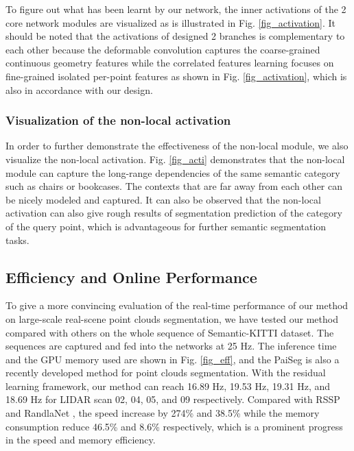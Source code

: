 \documentclass[journal]{IEEEtran}
\begin{document}
 To figure out what has been learnt by our network, the inner activations of the 2 core network modules are visualized as is illustrated in Fig. \ref{fig_activation}. It should be noted that the activations of designed 2 branches is complementary to each other because the deformable convolution captures the coarse-grained continuous geometry features while the correlated features learning focuses on fine-grained isolated per-point features as shown in Fig. \ref{fig_activation}, which is also in accordance with our design.
\subsubsection{Visualization of the non-local activation}


In order to further demonstrate the effectiveness of the non-local module, we also visualize the non-local activation. Fig. \ref{fig_acti} demonstrates that the non-local module can capture the long-range dependencies of the same semantic category such as chairs or bookcases. The contexts that are far away from each other can be nicely modeled and captured. It can also be observed that the non-local activation can also give rough results of segmentation prediction of the category of the query point, which is advantageous for further semantic segmentation tasks.
\vspace{-7mm}
\subsection{Efficiency and Online Performance}

To give a more convincing evaluation of the real-time performance of our method on large-scale real-scene point clouds segmentation, we have tested our method compared with others on the whole sequence of Semantic-KITTI \cite{behley2019semantickitti} dataset. The sequences are captured and fed into the networks at 25 Hz. The inference time and the GPU memory used are shown in Fig. \ref{fig_eff}, and the PaiSeg \cite{gao2020pai} is also a recently developed method for point clouds segmentation. With the residual learning framework, our method can reach 16.89 Hz, 19.53 Hz, 19.31 Hz, and 18.69 Hz for LIDAR scan 02, 04, 05, and 09 respectively. Compared with RSSP\cite{wang2019re} and RandlaNet \cite{hu2020randla}, the speed increase by 274\% and 38.5\% while the memory consumption reduce 46.5\% and 8.6\% respectively, which is a prominent progress in the speed and memory efficiency.
\end{document}
